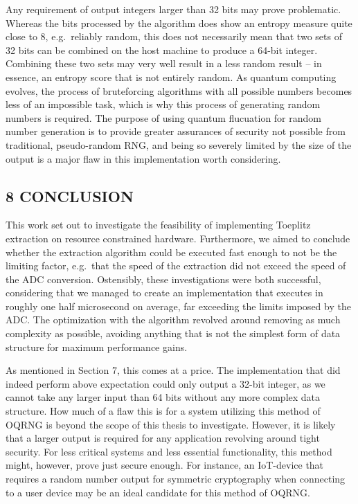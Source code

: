 Any requirement of output integers larger than 32 bits may prove problematic. Whereas the bits processed by the algorithm does show an entropy measure quite close to 8, e.g.~reliably random, this does not necessarily mean that two sets of 32 bits can be combined on the host machine to produce a 64-bit integer. Combining these two sets may very well result in a less random result -- in essence, an entropy score that is not entirely random. As quantum computing evolves, the process of bruteforcing algorithms with all possible numbers becomes less of an impossible task, which is why this process of generating random numbers is required. The purpose of using quantum flucuation for random number generation is to provide greater assurances of security not possible from traditional, pseudo-random RNG, and being so severely limited by the size of the output is a major flaw in this implementation worth considering.

\subsection{8 CONCLUSION}\label{conclusion}

This work set out to investigate the feasibility of implementing Toeplitz extraction on resource constrained hardware. Furthermore, we aimed to conclude whether the extraction algorithm could be executed fast enough to not be the limiting factor, e.g.~that the speed of the extraction did not exceed the speed of the ADC conversion. Ostensibly, these investigations were both successful, considering that we managed to create an implementation that executes in roughly one half microsecond on average, far exceeding the limits imposed by the ADC. The optimization with the algorithm revolved around removing as much complexity as possible, avoiding anything that is not the simplest form of data structure for maximum performance gains.

As mentioned in Section 7, this comes at a price. The implementation that did indeed perform above expectation could only output a 32-bit integer, as we cannot take any larger input than 64 bits without any more complex data structure. How much of a flaw this is for a system utilizing this method of OQRNG is beyond the scope of this thesis to investigate. However, it is likely that a larger output is required for any application revolving around tight security. For less critical systems and less essential functionality, this method might, however, prove just secure enough. For instance, an IoT-device that requires a random number output for symmetric cryptography when connecting to a user device may be an ideal candidate for this method of OQRNG.

